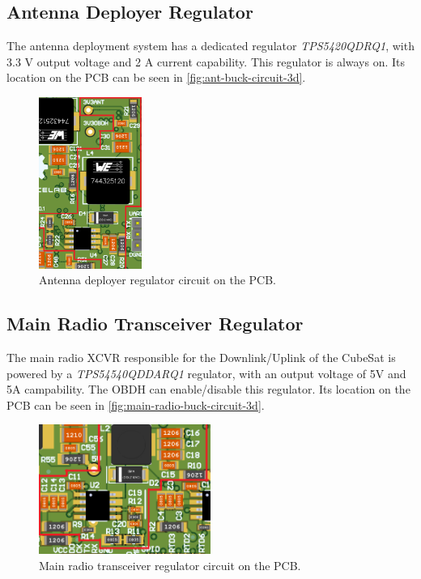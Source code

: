 \subsection{Antenna Deployer Regulator}

The antenna deployment system has a dedicated regulator \textit{TPS5420QDRQ1}, with 3.3 V output voltage and 2 A current capability. This regulator is always on.
Its location on the PCB can be seen in \autoref{fig:ant-buck-circuit-3d}.

\begin{figure}[!ht]
    \begin{center}
        \includegraphics[width=0.3\textwidth]{figures/ant-buck-circuit-3d.png}
        \caption{Antenna deployer regulator circuit on the PCB.}
        \label{fig:ant-buck-circuit-3d}
    \end{center}
\end{figure}

\subsection{Main Radio Transceiver Regulator}

The main radio XCVR responsible for the Downlink/Uplink of the CubeSat is powered by a \textit{TPS54540QDDARQ1} regulator, with an output voltage of 5V and 5A campability. The OBDH can enable/disable this regulator.
Its location on the PCB can be seen in \autoref{fig:main-radio-buck-circuit-3d}.

\begin{figure}[!ht]
    \begin{center}
        \includegraphics[width=0.5\textwidth]{figures/main-radio-buck-circuit-3d.png}
        \caption{Main radio transceiver regulator circuit on the PCB.}
        \label{fig:main-radio-buck-circuit-3d}
    \end{center}
\end{figure}

